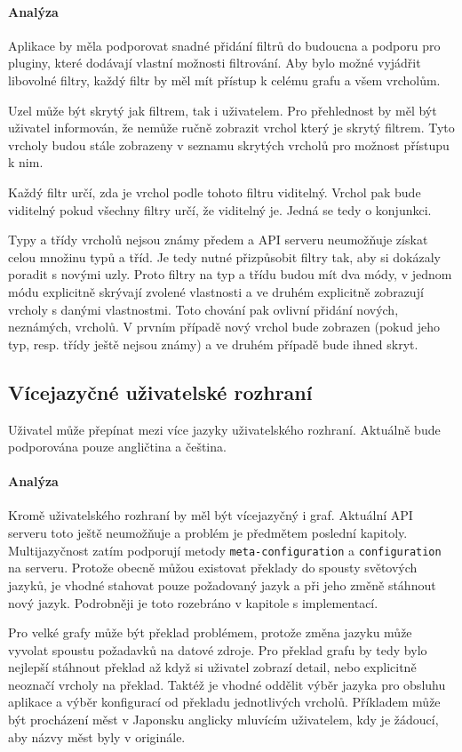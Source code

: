 \paragraph{Analýza} Aplikace by měla podporovat snadné přidání filtrů do budoucna a podporu pro pluginy, které dodávají vlastní možnosti filtrování. Aby bylo možné vyjádřit libovolné filtry, každý filtr by měl mít přístup k celému grafu a všem vrcholům.

Uzel může být skrytý jak filtrem, tak i uživatelem. Pro přehlednost by měl být uživatel informován, že nemůže ručně zobrazit vrchol který je skrytý filtrem. Tyto vrcholy budou stále zobrazeny v seznamu skrytých vrcholů pro možnost přístupu k nim.

Každý filtr určí, zda je vrchol podle tohoto filtru viditelný. Vrchol pak bude viditelný pokud všechny filtry určí, že viditelný je. Jedná se tedy o konjunkci.

Typy a třídy vrcholů nejsou známy předem a API serveru neumožňuje získat celou množinu typů a tříd. Je tedy nutné přizpůsobit filtry tak, aby si dokázaly poradit s novými uzly. Proto filtry na typ a třídu budou mít dva módy, v jednom módu explicitně skrývají zvolené vlastnosti a ve druhém explicitně zobrazují vrcholy s danými vlastnostmi. Toto chování pak ovlivní přidání nových, neznámých, vrcholů. V prvním případě nový vrchol bude zobrazen (pokud jeho typ, resp. třídy ještě nejsou známy) a ve druhém případě bude ihned skryt.

\subsection{Vícejazyčné uživatelské rozhraní}
Uživatel může přepínat mezi více jazyky uživatelského rozhraní. Aktuálně bude podporována pouze angličtina a čeština.

\paragraph{Analýza} Kromě uživatelského rozhraní by měl být vícejazyčný i graf. Aktuální API serveru toto ještě neumožňuje a problém je předmětem poslední kapitoly. Multijazyčnost zatím podporují metody \texttt{meta-configuration} a \texttt{configuration} na serveru. Protože obecně můžou existovat překlady do spousty světových jazyků, je vhodné stahovat pouze požadovaný jazyk a při jeho změně stáhnout nový jazyk. Podrobněji je toto rozebráno v kapitole s implementací. 

Pro velké grafy může být překlad problémem, protože změna jazyku může vyvolat spoustu požadavků na datové zdroje. Pro překlad grafu by tedy bylo nejlepší stáhnout překlad až když si uživatel zobrazí detail, nebo explicitně neoznačí vrcholy na překlad. Taktéž je vhodné oddělit výběr jazyka pro obsluhu aplikace a výběr konfigurací od překladu jednotlivých vrcholů. Příkladem může být procházení měst v Japonsku anglicky mluvícím uživatelem, kdy je žádoucí, aby názvy měst byly v originále.


